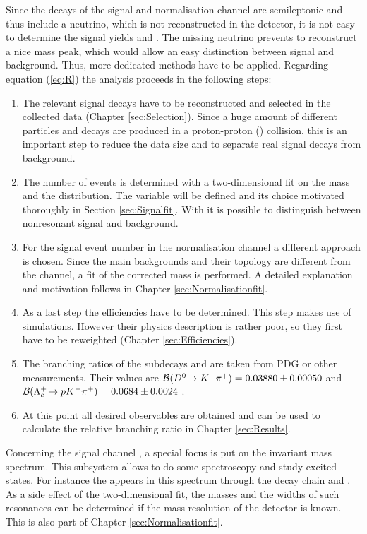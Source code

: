 Since the decays of the signal and normalisation channel are semileptonic and thus include a neutrino, which is not reconstructed in the detector, it is not easy to determine the signal yields \NDp and \NLc.
The missing neutrino prevents to reconstruct a nice \Lb mass peak, which would allow an easy distinction between signal and background.
Thus, more dedicated methods have to be applied.
Regarding equation (\ref{eq:R}) the analysis proceeds in the following steps:
\begin{enumerate}
    \item The relevant signal decays have to be reconstructed and selected in the collected data (Chapter \ref{sec:Selection}). 
          Since a huge amount of different particles and decays are produced in a proton-proton (\proton\proton) collision, this is an important step to reduce the data size and to separate real signal decays from background.
    \item The number of \LbToDpmunuX events \NLc is determined with a two-dimensional fit on the \Dz\proton mass and the \logIP distribution.
          The variable \logIP will be defined and its choice motivated thoroughly in Section \ref{sec:Signalfit}.
          With \logIP it is possible to distinguish between nonresonant signal and background.
    \item For the signal event number \NLc in the normalisation channel \LbToLcmunu a different approach is chosen.
          Since the main backgrounds and their topology are different from the \LbToDpmunuX channel, a fit of the corrected \Lb mass is performed.
          A detailed explanation and motivation follows in Chapter \ref{sec:Normalisationfit}.
    \item As a last step the efficiencies have to be determined.
          This step makes use of simulations.
          However their physics description is rather poor, so they first have to be reweighted (Chapter \ref{sec:Efficiencies}).
    \item The branching ratios of the subdecays \DToKpi and \LcTopKpi are taken from PDG or other measurements. 
          Their values are ${\cal B}({{D}^0}\!\rightarrow {\ensuremath{{K}^-}}{\ensuremath{{\pi}^+}}) = 0.03880 \pm 0.00050$ \cite{PDG} and ${\cal B}({{\Lambda}^+_{c}}\!\rightarrow {\ensuremath{p}}{\ensuremath{{K}^-}}{\ensuremath{{\pi}^+}}) = 0.0684 \pm 0.0024$ \cite{Belle_BR_LcTopKpi}.
    \item At this point all desired observables are obtained and can be used to calculate the relative branching ratio \R in Chapter \ref{sec:Results}.
\end{enumerate}

Concerning the signal channel \LbToDpmunuX, a special focus is put on the invariant \Dz\proton mass spectrum.
This subsystem allows to do some spectroscopy and study excited \Lc states.
For instance the \LcResI appears in this spectrum through the decay chain \decay{\Lb}{\LcResI\mun\neumb} and \decay{\LcResI}{\Dz\proton}.
As a side effect of the two-dimensional fit, the masses and the widths of such resonances can be determined if the mass resolution of the detector is known.
This is also part of Chapter \ref{sec:Normalisationfit}.
